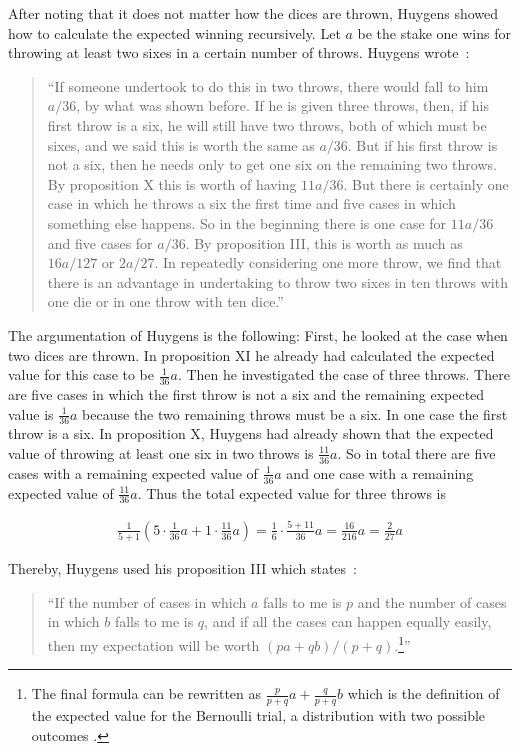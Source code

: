 After noting that it does not matter how the dices are thrown, Huygens showed how to calculate the expected winning recursively. Let $a$ be the stake one wins for throwing at least two sixes in a certain number of throws. Huygens wrote~\cite[p. 163]{bernoulli}:

\begin{quote}
  ``If someone undertook to do this in two throws, there would fall to him $a/36$, by what was shown before. If he is given three throws, then, if his first throw is a six, he will still have two throws, both of which must be sixes, and we said this is worth the same as $a/36$. But if his first throw is not a six, then he needs only to get one six on the remaining two throws. By proposition X this is worth of having $11a/36$. But there is certainly one case in which he throws a six the first time and five cases in which something else happens. So in the beginning there is one case for $11a/36$ and five cases for $a/36$. By proposition III, this is worth as much as $16a/127$ or $2a/27$. In repeatedly considering one more throw, we find that there is an advantage in undertaking to throw two sixes in ten throws with one die or in one throw with ten dice.''
\end{quote}

The argumentation of Huygens is the following: First, he looked at the case when two dices are thrown. In proposition XI he already had calculated the expected value for this case to be $\tfrac 1{36}a$. Then he investigated the case of three throws. There are five cases in which the first throw is not a six and the remaining expected value is $\tfrac 1{36}a$ because the two remaining throws must be a six. In one case the first throw is a six. In proposition X, Huygens had already shown that the expected value of throwing at least one six in two throws is $\tfrac{11}{36}a$. So in total there are five cases with a remaining expected value of $\tfrac 1{36}a$ and one case with a remaining expected value of $\tfrac{11}{36} a$. Thus the total expected value for three throws is

\begin{align}
  \frac{1}{5+1} \left(5 \cdot \frac 1{36} a + 1 \cdot \frac{11}{36} a \right) = \frac{1}{6} \cdot \frac{5+11}{36} a = \frac{16}{216} a = \frac{2}{27} a
\end{align}

\noindent Thereby, Huygens used his proposition III which states~\cite[p. 135]{bernoulli}:

\begin{quote}
  ``If the number of cases in which $a$ falls to me is $p$ and the number of cases in which $b$ falls to me is $q$, and if all the cases can happen equally easily, then my expectation will be worth $(pa+qb)/(p+q)$.\footnote{The final formula can be rewritten as $\tfrac{p}{p+q} a+\tfrac q{p+q} b$ which is the definition of the expected value for the Bernoulli trial, a distribution with two possible outcomes \cite{wiki:bernoulli_distribution}.}''
\end{quote}

